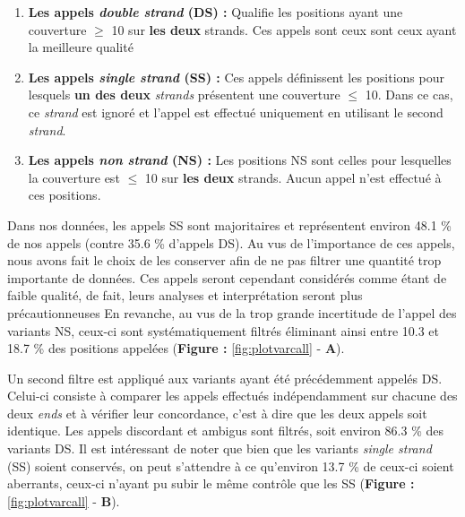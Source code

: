 \documentclass[12pt,twoside]{reedthesis}
\providecommand{\tightlist}{%
  \setlength{\itemsep}{0pt}\setlength{\parskip}{0pt}}
\theoremstyle{definition}
\theoremstyle{definition}
\theoremstyle{remark}
\begin{document}
  \begin{enumerate}
  \def\labelenumi{\arabic{enumi}.}
  \tightlist
  \item
    \textbf{Les appels \emph{double strand} (DS) :} Qualifie les positions
    ayant une couverture \(\ge\) 10 sur \textbf{les deux} strands. Ces
    appels sont ceux sont ceux ayant la meilleure qualité
  \item
    \textbf{Les appels \emph{single strand} (SS) :} Ces appels définissent
    les positions pour lesquels \textbf{un des deux} \emph{strands}
    présentent une couverture \(\le\) 10. Dans ce cas, ce \emph{strand}
    est ignoré et l'appel est effectué uniquement en utilisant le second
    \emph{strand}.\\
  \item
    \textbf{Les appels \emph{non strand} (NS) :} Les positions NS sont
    celles pour lesquelles la couverture est \(\le\) 10 sur \textbf{les
    deux} strands. Aucun appel n'est effectué à ces positions.
  \end{enumerate}
  
  Dans nos données, les appels SS sont majoritaires et représentent
  environ 48.1 \% de nos appels (contre 35.6 \% d'appels DS). Au vus de
  l'importance de ces appels, nous avons fait le choix de les conserver
  afin de ne pas filtrer une quantité trop importante de données. Ces
  appels seront cependant considérés comme étant de faible qualité, de
  fait, leurs analyses et interprétation seront plus précautionneuses En
  revanche, au vus de la trop grande incertitude de l'appel des variants
  NS, ceux-ci sont systématiquement filtrés éliminant ainsi entre 10.3 et
  18.7 \% des positions appelées (\textbf{Figure : }\ref{fig:plotvarcall}
  - \textbf{A}).
  
  Un second filtre est appliqué aux variants ayant été précédemment
  appelés DS. Celui-ci consiste à comparer les appels effectués
  indépendamment sur chacune des deux \emph{ends} et à vérifier leur
  concordance, c'est à dire que les deux appels soit identique. Les appels
  discordant et ambigus sont filtrés, soit environ 86.3 \% des variants
  DS. Il est intéressant de noter que bien que les variants \emph{single
  strand} (SS) soient conservés, on peut s'attendre à ce qu'environ 13.7
  \% de ceux-ci soient aberrants, ceux-ci n'ayant pu subir le même
  contrôle que les SS (\textbf{Figure : }\ref{fig:plotvarcall} -
  \textbf{B}).
  
\end{document}
